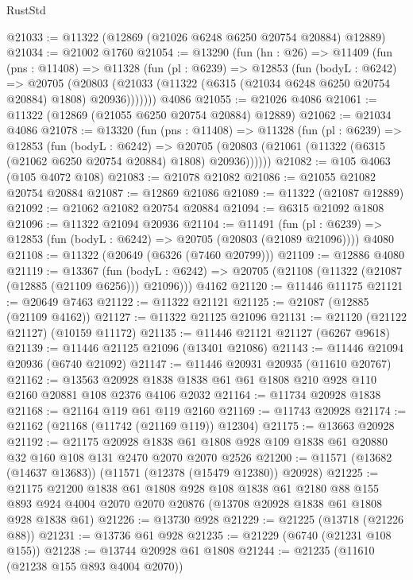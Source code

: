 \begin{lexlean}{RustStd}
\begin{coremodule}
@21033 := @11322 (@12869 (@21026 @6248 @6250 @20754 @20884) @12889)
@21034 := @21002 @1760
@21054 := @13290
    (fun (hn : @26) =>
    @11409
      (fun (pns : @11408) =>
      @11328
        (fun (pl : @6239) =>
        @12853
          (fun (bodyL : @6242) =>
          @20705
            (@20803 (@21033 (@11322 (@6315 (@21034 @6248 @6250 @20754 @20884) @1808) @20936)))))))
    @4086
@21055 := @21026 @4086
@21061 := @11322 (@12869 (@21055 @6250 @20754 @20884) @12889)
@21062 := @21034 @4086
@21078 := @13320
    (fun (pns : @11408) =>
    @11328
      (fun (pl : @6239) =>
      @12853
        (fun (bodyL : @6242) =>
        @20705 (@20803 (@21061 (@11322 (@6315 (@21062 @6250 @20754 @20884) @1808) @20936))))))
@21082 := @105 @4063 (@105 @4072 @108)
@21083 := @21078 @21082
@21086 := @21055 @21082 @20754 @20884
@21087 := @12869 @21086
@21089 := @11322 (@21087 @12889)
@21092 := @21062 @21082 @20754 @20884
@21094 := @6315 @21092 @1808
@21096 := @11322 @21094 @20936
@21104 := @11491
    (fun (pl : @6239) => @12853 (fun (bodyL : @6242) => @20705 (@20803 (@21089 @21096))))
    @4080
@21108 := @11322 (@20649 (@6326 (@7460 @20799)))
@21109 := @12886 @4080
@21119 := @13367
    (fun (bodyL : @6242) => @20705 (@21108 (@11322 (@21087 (@12885 (@21109 @6256))) @21096)))
    @4162
@21120 := @11446 @11175
@21121 := @20649 @7463
@21122 := @11322 @21121
@21125 := @21087 (@12885 (@21109 @4162))
@21127 := @11322 @21125 @21096
@21131 := @21120 (@21122 @21127) (@10159 @11172)
@21135 := @11446 @21121 @21127 (@6267 @9618)
@21139 := @11446 @21125 @21096 (@13401 @21086)
@21143 := @11446 @21094 @20936 (@6740 @21092)
@21147 := @11446 @20931 @20935 (@11610 @20767)
@21162 := @13563 @20928 @1838 @1838 @61 @61 @1808 @210 @928 @110 @2160 @20881 @108 @2376 @4106 @2032
@21164 := @11734 @20928 @1838
@21168 := @21164 @119 @61 @119 @2160
@21169 := @11743 @20928
@21174 := @21162 (@21168 (@11742 (@21169 @119)) @12304)
@21175 := @13663 @20928
@21192 := @21175
    @20928
    @1838
    @61
    @1808
    @928
    @109
    @1838
    @61
    @20880
    @32
    @160
    @108
    @131
    @2470
    @2070
    @2070
    @2526
@21200 := @11571 (@13682 (@14637 @13683)) (@11571 (@12378 (@15479 @12380)) @20928)
@21225 := @21175
    @21200
    @1838
    @61
    @1808
    @928
    @108
    @1838
    @61
    @2180
    @88
    @155
    @893
    @924
    @4004
    @2070
    @2070
    @20876
    (@13708 @20928 @1838 @61 @1808 @928 @1838 @61)
@21226 := @13730 @928
@21229 := @21225 (@13718 (@21226 @88))
@21231 := @13736 @61 @928
@21235 := @21229 (@6740 (@21231 @108 @155))
@21238 := @13744 @20928 @61 @1808
@21244 := @21235 (@11610 (@21238 @155 @893 @4004 @2070))

\end{coremodule}
\end{lexlean}

